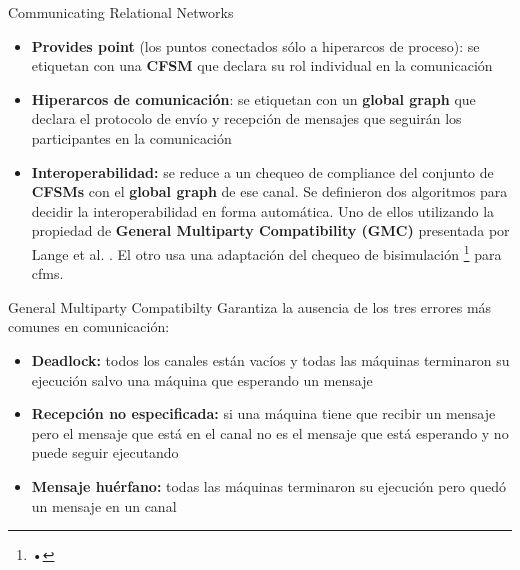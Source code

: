\documentclass[10pt,xcolor={table,dvipsnames},t]{beamer}
\begin{document}
\begin{frame}{Communicating Relational Networks}
 \vspace{\fill}
\begin{itemize}
    \item \textbf{Provides point} (los puntos conectados sólo a hiperarcos de proceso): se etiquetan con una \textbf{CFSM} que declara su rol individual en la comunicación
    \item \textbf{Hiperarcos de comunicación}: se etiquetan con un \textbf{global graph} que declara el protocolo de envío y recepción de mensajes que seguirán los participantes en la comunicación
    \item \textbf{Interoperabilidad:} se reduce a un chequeo de compliance del conjunto de \textbf{CFSMs} con el \textbf{global graph} de ese canal. Se definieron dos algoritmos para decidir la interoperabilidad en forma automática. Uno de ellos utilizando la propiedad de \textbf{General Multiparty Compatibility (GMC)} presentada por Lange et al. \cite{lange:popl15}. El otro usa una adaptación del chequeo de bisimulación \footnote{•} para cfms.
\end{itemize}
 \vspace{\fill}
\end{frame}

\begin{frame}{General Multiparty Compatibilty}
\vspace{\fill}
Garantiza la ausencia de los tres errores más comunes en comunicación:
 \begin{itemize}
        \item \textbf{Deadlock:} todos los canales están vacíos y todas las máquinas terminaron su ejecución salvo una máquina que esperando un mensaje
        \item \textbf{Recepción no especificada:} si una máquina tiene que recibir un mensaje pero el mensaje que está en el canal no es el mensaje que está esperando y no puede seguir ejecutando
        \item \textbf{Mensaje huérfano:} todas las máquinas terminaron su ejecución pero quedó un mensaje en un canal
    \end{itemize}
\vspace{\fill}
\end{frame}
\end{document}
